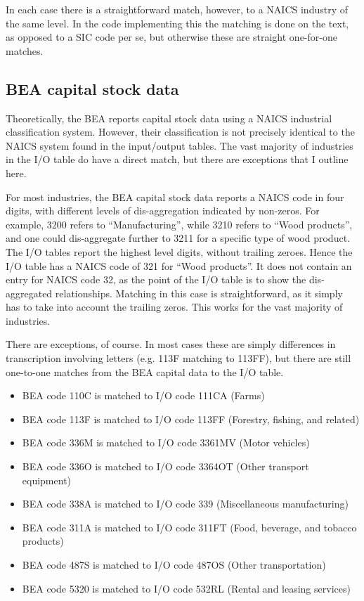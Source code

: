 \documentclass[11pt]{article}
\begin{document}
In each case there is a straightforward match, however, to a NAICS industry of the same level. In the code implementing this the matching is done on the text, as opposed to a SIC code per se, but otherwise these are straight one-for-one matches.

\subsection{BEA capital stock data}
Theoretically, the BEA reports capital stock data using a NAICS industrial classification system. However, their classification is not precisely identical to the NAICS system found in the input/output tables. The vast majority of industries in the I/O table do have a direct match, but there are exceptions that I outline here. 

For most industries, the BEA capital stock data reports a NAICS code in four digits, with different levels of dis-aggregation indicated by non-zeros. For example, 3200 refers to ``Manufacturing'', while 3210 refers to ``Wood products'', and one could dis-aggregate further to 3211 for a specific type of wood product. The I/O tables report the highest level digits, without trailing zeroes. Hence the I/O table has a NAICS code of 321 for ``Wood products''. It does not contain an entry for NAICS code 32, as the point of the I/O table is to show the dis-aggregated relationships. Matching in this case is straightforward, as it simply has to take into account the trailing zeros. This works for the vast majority of industries. 

There are exceptions, of course. In most cases these are simply differences in transcription involving letters (e.g. 113F matching to 113FF), but there are still one-to-one matches from the BEA capital data to the I/O table.

\begin{itemize}
	\item BEA code 110C is matched to I/O code 111CA (Farms)
	\item BEA code 113F is matched to I/O code 113FF (Forestry, fishing, and related)
	\item BEA code 336M is matched to I/O code 3361MV (Motor vehicles)
	\item BEA code 336O is matched to I/O code 3364OT (Other transport equipment)
	\item BEA code 338A is matched to I/O code 339 (Miscellaneous manufacturing)
	\item BEA code 311A is matched to I/O code 311FT (Food, beverage, and tobacco products)
	\item BEA code 487S is matched to I/O code 487OS (Other transportation)
	\item BEA code 5320 is matched to I/O code 532RL (Rental and leasing services)
\end{itemize}
\end{document}
